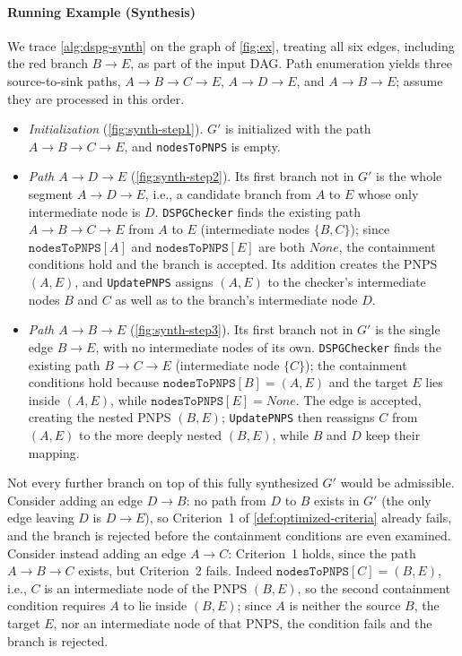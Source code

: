 \paragraph{Running Example (Synthesis)}
We trace \cref{alg:dspg-synth} on the graph of \cref{fig:ex}, treating all six edges, including the red branch $B \to E$, as part of the input \ac{DAG}. Path enumeration yields three source-to-sink paths, $A{\to}B{\to}C{\to}E$, $A{\to}D{\to}E$, and $A{\to}B{\to}E$; assume they are processed in this order.
\begin{itemize}
    \item \emph{Initialization} (\cref{fig:synth-step1}). $G'$ is initialized with the path $A{\to}B{\to}C{\to}E$, and \texttt{nodesToPNPS} is empty.
    \item \emph{Path $A{\to}D{\to}E$} (\cref{fig:synth-step2}). Its first branch not in $G'$ is the whole segment $A{\to}D{\to}E$, i.e., a candidate branch from $A$ to $E$ whose only intermediate node is $D$. \texttt{DSPGChecker} finds the existing path $A{\to}B{\to}C{\to}E$ from $A$ to $E$ (intermediate nodes $\{B, C\}$); since $\texttt{nodesToPNPS}[A]$ and $\texttt{nodesToPNPS}[E]$ are both $None$, the containment conditions hold and the branch is accepted. Its addition creates the \ac{PNPS} $(A,E)$, and \texttt{UpdatePNPS} assigns $(A,E)$ to the checker's intermediate nodes $B$ and $C$ as well as to the branch's intermediate node $D$.
    \item \emph{Path $A{\to}B{\to}E$} (\cref{fig:synth-step3}). Its first branch not in $G'$ is the single edge $B \to E$, with no intermediate nodes of its own. \texttt{DSPGChecker} finds the existing path $B{\to}C{\to}E$ (intermediate node $\{C\}$); the containment conditions hold because $\texttt{nodesToPNPS}[B]=(A,E)$ and the target $E$ lies inside $(A,E)$, while $\texttt{nodesToPNPS}[E]=None$. The edge is accepted, creating the nested \ac{PNPS} $(B,E)$; \texttt{UpdatePNPS} then reassigns $C$ from $(A,E)$ to the more deeply nested $(B,E)$, while $B$ and $D$ keep their mapping.
\end{itemize}
Not every further branch on top of this fully synthesized $G'$ would be admissible. Consider adding an edge $D \to B$: no path from $D$ to $B$ exists in $G'$ (the only edge leaving $D$ is $D \to E$), so Criterion~1 of \cref{def:optimized-criteria} already fails, and the branch is rejected before the containment conditions are even examined. Consider instead adding an edge $A \to C$: Criterion~1 holds, since the path $A \to B \to C$ exists, but Criterion~2 fails. Indeed $\texttt{nodesToPNPS}[C] = (B,E)$, i.e., $C$ is an intermediate node of the \ac{PNPS} $(B,E)$, so the second containment condition requires $A$ to lie inside $(B,E)$; since $A$ is neither the source $B$, the target $E$, nor an intermediate node of that \ac{PNPS}, the condition fails and the branch is rejected.


